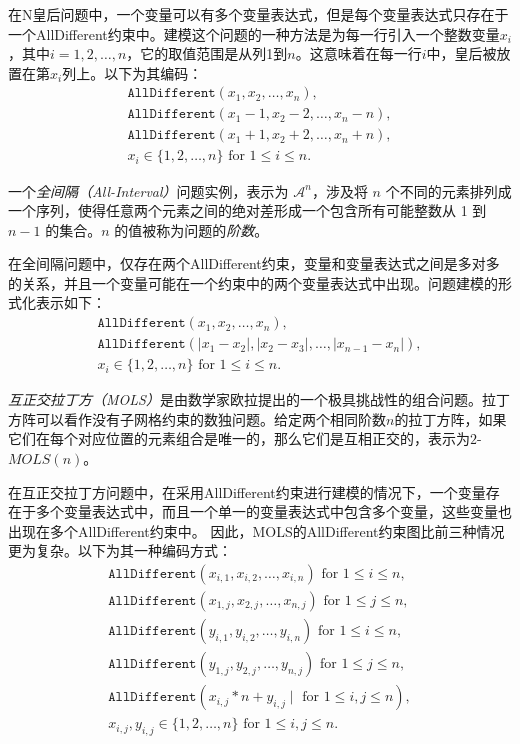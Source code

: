 在N皇后问题中，一个变量可以有多个变量表达式，但是每个变量表达式只存在于一个AllDifferent约束中。建模这个问题的一种方法是为每一行引入一个整数变量$x_i$，其中$i = 1, 2, \dots, n$，它的取值范围是从列1到$n$。这意味着在每一行$i$中，皇后被放置在第$x_i$列上。以下为其编码：
\begin{align*}
    &\texttt {AllDifferent} (x_{1}, x_{2}, \dots, x_{n}), & \\
    &\texttt {AllDifferent} (x_{1}-1, x_{2}-2, \dots, x_{n}-n), & \\
    &\texttt {AllDifferent} (x_{1}+1, x_{2}+2, \dots, x_{n}+n), & \\
    &x_{i} \in\{1, 2, \dots, n\} \text { for } 1 \leq i \leq n.&
\end{align*}%


\begin{definition}[全间隔]
一个\textit{全间隔（All-Interval）}问题实例，表示为 $\mathcal{A}^n$，涉及将 $n$ 个不同的元素排列成一个序列，使得任意两个元素之间的绝对差形成一个包含所有可能整数从 1 到 $n-1$ 的集合。$n$ 的值被称为问题的\textit{阶数}。
\end{definition}

在全间隔问题中，仅存在两个AllDifferent约束，变量和变量表达式之间是多对多的关系，并且一个变量可能在一个约束中的两个变量表达式中出现。问题建模的形式化表示如下：
\begin{align*}
    &\texttt {AllDifferent} (x_{1}, x_{2}, \dots, x_{n}), & \\
    &\texttt {AllDifferent} (|x_{1}-x_{2}|, |x_{2}-x_{3}|, \dots, |x_{n-1}-x_{n}|), & \\
    &x_{i} \in\{1, 2, \dots, n\} \text { for } 1 \leq i \leq n.&
\end{align*}%

\begin{definition}[互正交拉丁方]
\textit{互正交拉丁方（MOLS）}是由数学家欧拉提出的一个极具挑战性的组合问题。拉丁方阵可以看作没有子网格约束的数独问题。给定两个相同阶数$n$的拉丁方阵，如果它们在每个对应位置的元素组合是唯一的，那么它们是互相正交的，表示为$2$-$MOLS(n)$。
\end{definition}

在互正交拉丁方问题中，在采用AllDifferent约束进行建模的情况下，一个变量存在于多个变量表达式中，而且一个单一的变量表达式中包含多个变量，这些变量也出现在多个AllDifferent约束中。
因此，MOLS的AllDifferent约束图比前三种情况更为复杂。以下为其一种编码方式：
\begin{align*}
    &\texttt {AllDifferent} (x_{i,1}, x_{i,2}, \dots, x_{i,n}) \text{  for } 1 \leq i \leq n, & \\
    &\texttt {AllDifferent} (x_{1,j}, x_{2,j}, \dots, x_{n,j}) \text{  for } 1 \leq j \leq n, & \\
    &\texttt {AllDifferent} (y_{i,1}, y_{i,2}, \dots, y_{i,n}) \text{  for } 1 \leq i \leq n, & \\
    &\texttt {AllDifferent} (y_{1,j}, y_{2,j}, \dots, y_{n,j}) \text{  for } 1 \leq j \leq n, & \\
    &\texttt {AllDifferent} (x_{i,j}*n+y_{i,j} \mid \text{ for } 1 \leq i,j \leq n), & \\
    &x_{i, j}, y_{i, j} \in\{1, 2, \dots, n\} \text { for } 1 \leq i, j \leq n.&
\end{align*}%

